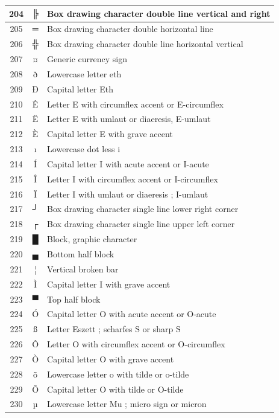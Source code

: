 {\begin{longtable}{|c|c|l|}
\hline
204 & ╠ & Box drawing character double line vertical and right \\
\hline
205 & ═ & Box drawing character double horizontal line \\
\hline
206 & ╬ & Box drawing character double line horizontal vertical \\
\hline
207 & ¤ & Generic currency sign \\
\hline
208 & ð & Lowercase letter eth \\
\hline
209 & Ð & Capital letter Eth \\
\hline
210 & Ê & Letter E with circumflex accent or E-circumflex \\
\hline
211 & Ë & Letter E with umlaut or diaeresis, E-umlaut \\
\hline
212 & È & Capital letter E with grave accent \\
\hline
213 & ı & Lowercase dot less i \\
\hline
214 & Í & Capital letter I with acute accent or I-acute \\
\hline
215 & Î & Letter I with circumflex accent or I-circumflex \\
\hline
216 & Ï & Letter I with umlaut or diaeresis ; I-umlaut \\
\hline
217 & ┘ & Box drawing character single line lower right corner \\
\hline
218 & ┌ & Box drawing character single line upper left corner \\
\hline
219 & █ & Block, graphic character \\
\hline
220 & ▄ & Bottom half block \\
\hline
221 & ¦ & Vertical broken bar \\
\hline
222 & Ì & Capital letter I with grave accent \\
\hline
223 & ▀ & Top half block \\
\hline
224 & Ó & Capital letter O with acute accent or O-acute \\
\hline
225 & ß & Letter Eszett ; scharfes S or sharp S \\
\hline
226 & Ô & Letter O with circumflex accent or O-circumflex \\
\hline
227 & Ò & Capital letter O with grave accent \\
\hline
228 & õ & Lowercase letter o with tilde or o-tilde \\
\hline
229 & Õ & Capital letter O with tilde or O-tilde \\
\hline
230 & µ & Lowercase letter Mu ; micro sign or micron \\

\end{longtable}}
